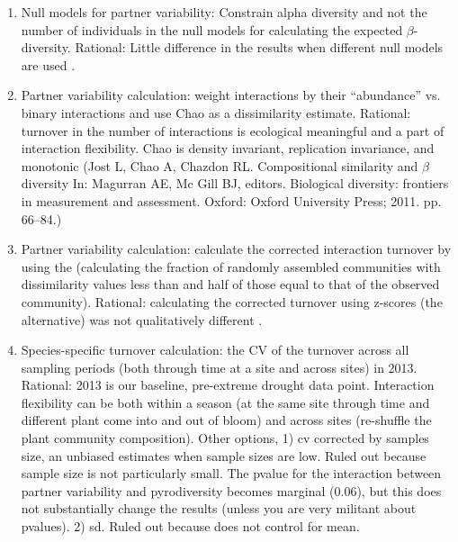 \documentclass{article}\usepackage[]{graphicx}\usepackage[]{color}
\begin{document}
\begin{enumerate}
\item Null models for partner variability: Constrain alpha diversity
  and not the number of individuals in the null models for calculating
  the expected $\beta$-diversity. Rational: Little difference in the
  results when different null models are used \citep{ponisio2015farm}.
\item Partner variability calculation: weight interactions by their
  ``abundance'' vs. binary interactions and use Chao as a
  dissimilarity estimate. Rational: turnover in the number of
  interactions is ecological meaningful and a part of interaction
  flexibility. Chao \citep{chao-2005-148} is density invariant,
  replication invariance, and monotonic (Jost L, Chao A, Chazdon
  RL. Compositional similarity and $\beta$ diversity In: Magurran AE,
  Mc Gill BJ, editors. Biological diversity: frontiers in measurement
  and assessment. Oxford: Oxford University Press; 2011. pp. 66–84.)
\item Partner variability calculation: calculate the corrected
  interaction turnover by using the \citep{Chase2011} (calculating the
  fraction of randomly assembled communities with dissimilarity values
  less than and half of those equal to that of the observed
  community). Rational: calculating the corrected turnover using
  z-scores (the alternative) was not qualitatively different
  \citep{ponisio2015farm}.
\item Species-specific turnover calculation: the CV of the turnover
  across all sampling periods (both through time at a site and across
  sites) in 2013. Rational: 2013 is our baseline, pre-extreme drought
  data point. Interaction flexibility can be both within a season (at
  the same site through time and different plant come into and out of
  bloom) and across sites (re-shuffle the plant community
  composition). Other options, 1) cv corrected by samples size, an
  unbiased estimates when sample sizes are low. Ruled out because
  sample size is not particularly small. The pvalue for the
  interaction between partner variability and pyrodiversity becomes
  marginal (0.06), but this does not substantially change the results
  (unless you are very militant about pvalues). 2) sd. Ruled out
  because does not control for mean.
\end{enumerate}
\end{document}
